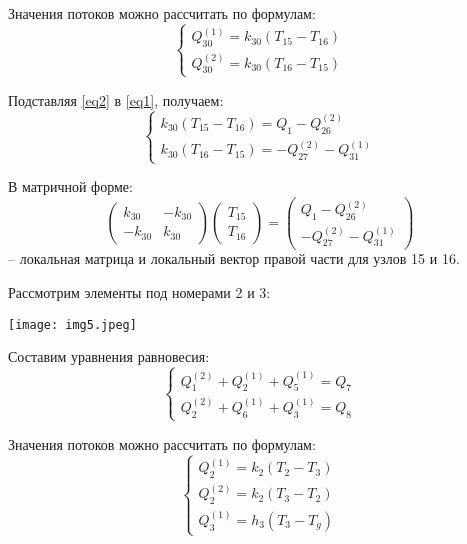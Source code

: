 \documentclass[a4paper, 12pt]{article}
\begin{document}
Значения потоков можно рассчитать по формулам:
\begin{equation} \label{eq2}
\begin{cases}
Q_{30}^{(1)} = k_{30} (T_{15} - T_{16})\\
Q_{30}^{(2)} =  k_{30} (T_{16} - T_{15})
\end{cases}
\end{equation} 

Подставляя \eqref{eq2} в \eqref{eq1}, получаем:
\begin{equation} \label{eq3}
\begin{cases}
k_{30} (T_{15} - T_{16}) = Q_1 - Q_{26}^{(2)}\\
 k_{30} (T_{16} - T_{15})  = -Q_{27}^{(2)} - Q_{31}^{(1)}
\end{cases}
\end{equation} 

В матричной форме:
\begin{equation} \label{eq4}
\begin{pmatrix}
k_{30} & -k_{30}\\
-k_{30} & k_{30}
\end{pmatrix}
\begin{pmatrix}
T_{15}\\
T_{16}
\end{pmatrix} =
\begin{pmatrix}
Q_1 - Q_{26}^{(2)}\\
-Q_{27}^{(2)} - Q_{31}^{(1)}
\end{pmatrix}
\end{equation} 
-- локальная матрица и локальный вектор правой части для узлов 15 и 16.

Рассмотрим элементы под номерами 2 и 3:
\begin{center}
\texttt{[image: img5.jpeg]}
\end{center}

Составим уравнения равновесия:
\begin{equation} \label{eq5}
\begin{cases}
Q_{1}^{(2)} + Q_{2}^{(1)} + Q_{5}^{(1)} = Q_7\\
Q_{2}^{(2)} + Q_{6}^{(1)} + Q_{3}^{(1)} = Q_8
\end{cases}
\end{equation} 

Значения потоков можно рассчитать по формулам:
\begin{equation} \label{eq6}
\begin{cases}
Q_{2}^{(1)} = k_2 (T_2 - T_3)\\
Q_{2}^{(2)} = k_2 (T_3 - T_2)\\
Q_{3}^{(1)} = h_3 (T_3 - T_g)
\end{cases}
\end{equation} 
\end{document}
